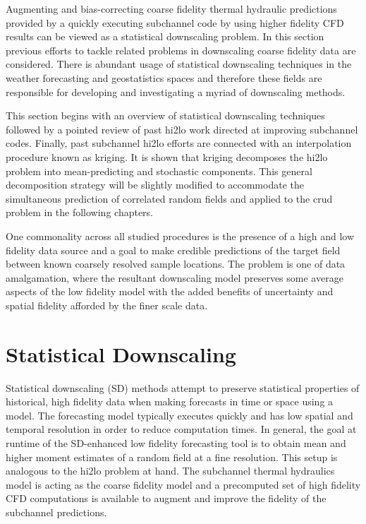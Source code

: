 
Augmenting and bias-correcting coarse fidelity thermal hydraulic predictions provided by a quickly executing subchannel code by using higher fidelity CFD results can be viewed as a statistical downscaling problem.  In this section previous efforts to tackle related problems in downscaling coarse fidelity data are considered. There is abundant usage of statistical downscaling techniques in the weather forecasting and geostatistics spaces and therefore these fields are responsible for developing and investigating a myriad of downscaling methods.  

This section begins with an overview of statistical downscaling techniques followed by a pointed review of past hi2lo work directed at improving subchannel codes.  Finally, past subchannel hi2lo efforts are connected with an interpolation procedure known as kriging.  It is shown that kriging decomposes the hi2lo problem into mean-predicting and stochastic components.  This general decomposition strategy will be slightly modified to accommodate the simultaneous prediction of correlated random fields and applied to the crud problem in the following chapters.

One commonality across all studied procedures is the presence of a high and low fidelity data source and a goal to make credible predictions of the target field between known coarsely resolved sample locations.  The problem is one of data amalgamation, where the resultant downscaling model preserves some average aspects of the low fidelity model with the added benefits of uncertainty and spatial fidelity afforded by the finer scale data.

\section{Statistical Downscaling}

Statistical downscaling (SD) methods attempt to preserve statistical properties of historical, high fidelity data when making forecasts in time or space using a model. The forecasting model typically executes quickly and has low spatial and temporal resolution in order to reduce computation times.  In general, the goal at runtime of the SD-enhanced low fidelity forecasting tool is to obtain mean and higher moment estimates of a random field at a fine resolution.  This setup is analogous to the hi2lo problem at hand.  The subchannel thermal hydraulics model is acting as the coarse fidelity model and a precomputed set of high fidelity CFD computations is available to augment and improve the fidelity of the subchannel predictions.

